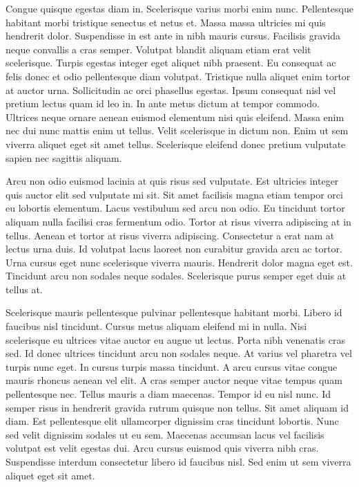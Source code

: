\documentclass[11pt,a4paper]{article}
\begin{document}
Congue quisque egestas diam in. Scelerisque varius morbi enim nunc. Pellentesque habitant morbi tristique senectus et netus et. Massa massa ultricies mi quis hendrerit dolor. Suspendisse in est ante in nibh mauris cursus. Facilisis gravida neque convallis a cras semper. Volutpat blandit aliquam etiam erat velit scelerisque. Turpis egestas integer eget aliquet nibh praesent. Eu consequat ac felis donec et odio pellentesque diam volutpat. Tristique nulla aliquet enim tortor at auctor urna. Sollicitudin ac orci phasellus egestas. Ipsum consequat nisl vel pretium lectus quam id leo in. In ante metus dictum at tempor commodo. Ultrices neque ornare aenean euismod elementum nisi quis eleifend. Massa enim nec dui nunc mattis enim ut tellus. Velit scelerisque in dictum non. Enim ut sem viverra aliquet eget sit amet tellus. Scelerisque eleifend donec pretium vulputate sapien nec sagittis aliquam.

Arcu non odio euismod lacinia at quis risus sed vulputate. Est ultricies integer quis auctor elit sed vulputate mi sit. Sit amet facilisis magna etiam tempor orci eu lobortis elementum. Lacus vestibulum sed arcu non odio. Eu tincidunt tortor aliquam nulla facilisi cras fermentum odio. Tortor at risus viverra adipiscing at in tellus. Aenean et tortor at risus viverra adipiscing. Consectetur a erat nam at lectus urna duis. Id volutpat lacus laoreet non curabitur gravida arcu ac tortor. Urna cursus eget nunc scelerisque viverra mauris. Hendrerit dolor magna eget est. Tincidunt arcu non sodales neque sodales. Scelerisque purus semper eget duis at tellus at.

Scelerisque mauris pellentesque pulvinar pellentesque habitant morbi. Libero id faucibus nisl tincidunt. Cursus metus aliquam eleifend mi in nulla. Nisi scelerisque eu ultrices vitae auctor eu augue ut lectus. Porta nibh venenatis cras sed. Id donec ultrices tincidunt arcu non sodales neque. At varius vel pharetra vel turpis nunc eget. In cursus turpis massa tincidunt. A arcu cursus vitae congue mauris rhoncus aenean vel elit. A cras semper auctor neque vitae tempus quam pellentesque nec. Tellus mauris a diam maecenas. Tempor id eu nisl nunc. Id semper risus in hendrerit gravida rutrum quisque non tellus. Sit amet aliquam id diam. Est pellentesque elit ullamcorper dignissim cras tincidunt lobortis. Nunc sed velit dignissim sodales ut eu sem. Maecenas accumsan lacus vel facilisis volutpat est velit egestas dui. Arcu cursus euismod quis viverra nibh cras. Suspendisse interdum consectetur libero id faucibus nisl. Sed enim ut sem viverra aliquet eget sit amet.
\end{document}
